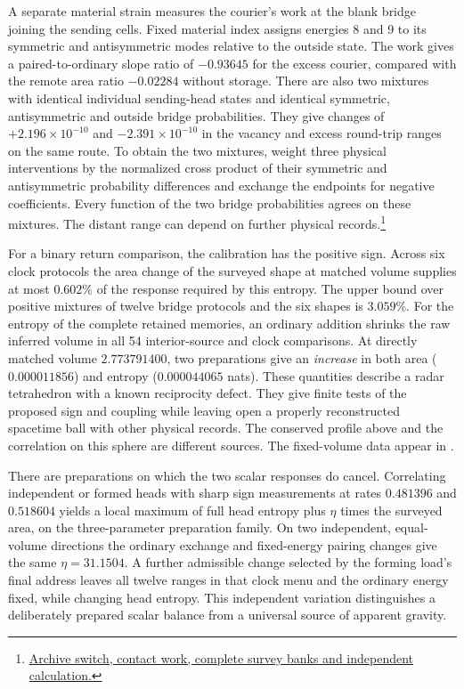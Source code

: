 \documentclass[11pt]{article}
\begin{document}
A separate material strain measures the courier's work at the blank
bridge joining the sending cells. Fixed material index assigns energies
8 and 9 to its symmetric and antisymmetric modes relative to the
outside state. The work gives a paired-to-ordinary slope ratio of
$-0.93645$ for the excess courier, compared with the remote area ratio
$-0.02284$ without storage. There are also two mixtures with identical
individual sending-head states and identical symmetric, antisymmetric
and outside bridge probabilities. They give changes of
$+2.196\times10^{-10}$ and $-2.391\times10^{-10}$ in the vacancy and
excess round-trip ranges on the same route. To obtain the two mixtures,
weight three physical interventions by the normalized cross product
of their symmetric and antisymmetric probability differences and exchange
the endpoints for negative coefficients. Every function of the two
bridge probabilities agrees on these mixtures. The distant range can
depend on further physical records.\footnote{\href{https://github.com/FloatingPragma/observer-patch-holography/tree/main/openwave/interval_echo/row_19/recovery_identity}{Archive switch, contact work, complete survey banks and independent calculation.}}

For a binary return comparison, the calibration has the positive
sign. Across six clock protocols the area change of the surveyed
shape at matched volume supplies at most $0.602\%$ of the
response required by this entropy. The upper bound over positive
mixtures of twelve bridge protocols and the six shapes is $3.059\%$.
For the entropy of the complete retained memories, an ordinary
addition shrinks the raw inferred volume in all 54 interior-source
and clock comparisons. At directly matched volume $2.773791400$,
two preparations give an \emph{increase} in both area
($0.000011856$) and entropy ($0.000044065$ nats).
These quantities describe a radar tetrahedron with a known
reciprocity defect. They give finite tests of the proposed sign
and coupling while leaving open a properly reconstructed
spacetime ball with other physical records. The conserved profile
above and the correlation on this sphere are different sources.
The fixed-volume data appear in
.

There are preparations on which the two scalar responses do cancel.
Correlating independent or formed heads with sharp sign measurements
at rates $0.481396$ and $0.518604$ yields a local maximum of full
head entropy plus $\eta$ times the surveyed area, on the
three-parameter preparation family. On two independent, equal-volume
directions the ordinary exchange and fixed-energy pairing changes
give the same $\eta=31.1504$. A further admissible change selected
by the forming load's final address leaves all twelve ranges in that
clock menu and the ordinary energy fixed, while changing head entropy.
This independent variation distinguishes a deliberately prepared
scalar balance from a universal source of apparent gravity.
\end{document}
